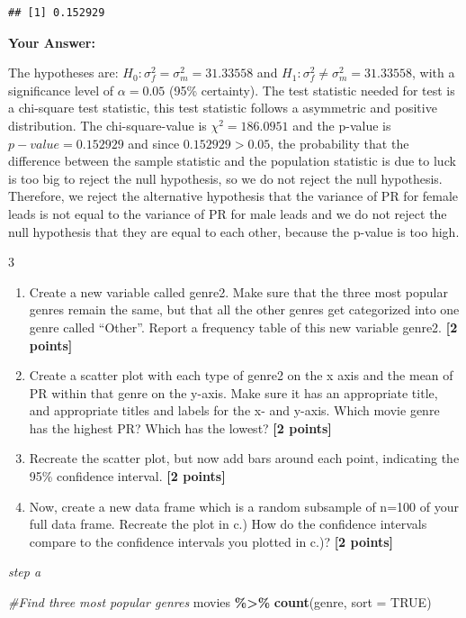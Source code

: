\documentclass[
]{article}
\newenvironment{Shaded}{\begin{snugshade}}{\end{snugshade}}
\newcommand{\AttributeTok}[1]{\textcolor[rgb]{0.13,0.29,0.53}{#1}}
\newcommand{\CommentTok}[1]{\textcolor[rgb]{0.56,0.35,0.01}{\textit{#1}}}
\newcommand{\ConstantTok}[1]{\textcolor[rgb]{0.56,0.35,0.01}{#1}}
\newcommand{\FunctionTok}[1]{\textcolor[rgb]{0.13,0.29,0.53}{\textbf{#1}}}
\newcommand{\NormalTok}[1]{#1}
\newcommand{\SpecialCharTok}[1]{\textcolor[rgb]{0.81,0.36,0.00}{\textbf{#1}}}
\providecommand{\tightlist}{%
  \setlength{\itemsep}{0pt}\setlength{\parskip}{0pt}}
\begin{document}
\begin{verbatim}
## [1] 0.152929
\end{verbatim}

\textbf{Your Answer:}

The hypotheses are: \(H_0:\sigma^2_f=\sigma^2_m=31.33558\) and
\(H_1:\sigma^2_f\neq\sigma^2_m=31.33558\), with a significance level of
\(\alpha=0.05\) (95\% certainty). The test statistic needed for test is
a chi-square test statistic, this test statistic follows a asymmetric
and positive distribution. The chi-square-value is \(\chi^2=186.0951\)
and the p-value is \(p-value=0.152929\) and since \(0.152929>0.05\), the
probability that the difference between the sample statistic and the
population statistic is due to luck is too big to reject the null
hypothesis, so we do not reject the null hypothesis. Therefore, we
reject the alternative hypothesis that the variance of PR for female
leads is not equal to the variance of PR for male leads and we do not
reject the null hypothesis that they are equal to each other, because
the p-value is too high.

3

\begin{enumerate}
\def\labelenumi{\alph{enumi}.}
\tightlist
\item
  Create a new variable called genre2. Make sure that the three most
  popular genres remain the same, but that all the other genres get
  categorized into one genre called ``Other''. Report a frequency table
  of this new variable genre2. \textbf{[2 points]}
\item
  Create a scatter plot with each type of genre2 on the x axis and the
  mean of PR within that genre on the y-axis. Make sure it has an
  appropriate title, and appropriate titles and labels for the x- and
  y-axis. Which movie genre has the highest PR? Which has the lowest?
  \textbf{[2 points]}
\item
  Recreate the scatter plot, but now add bars around each point,
  indicating the 95\% confidence interval. \textbf{[2 points]}
\item
  Now, create a new data frame which is a random subsample of n=100 of
  your full data frame. Recreate the plot in c.) How do the confidence
  intervals compare to the confidence intervals you plotted in c.)?
  \textbf{[2 points]}
\end{enumerate}

\emph{step a}

\begin{Shaded}
\begin{Highlighting}[]
\CommentTok{\#Find three most popular genres}
\NormalTok{movies }\SpecialCharTok{\%\textgreater{}\%} \FunctionTok{count}\NormalTok{(genre, }\AttributeTok{sort =} \ConstantTok{TRUE}\NormalTok{)}
\end{Highlighting}
\end{Shaded}
\end{document}
